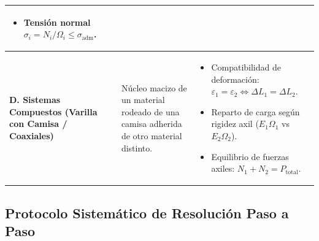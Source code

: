 \begin{table}[H]
{\begin{tabular}{p{4.2cm} p{5.5cm} p{6.2cm}}
\begin{itemize}[leftmargin=*, nosep]
                \item Tensión normal $\sigma_i = N_i / \Omega_i \le \sigma_{\text{adm}}$.
            \end{itemize} \\
            \midrule
            \textbf{D. Sistemas Compuestos (Varilla con Camisa / Coaxiales)} &
            Núcleo macizo de un material rodeado de una camisa adherida de otro material distinto. &
            \begin{itemize}[leftmargin=*, nosep]
                \item Compatibilidad de deformación: $\varepsilon_1 = \varepsilon_2 \iff \Delta L_1 = \Delta L_2$.
                \item Reparto de carga según rigidez axil ($E_1 \Omega_1$ vs $E_2 \Omega_2$).
                \item Equilibrio de fuerzas axiles: $N_1 + N_2 = P_{\text{total}}$.
            \end{itemize} \\
            \bottomrule
        \end{tabular}%
    }
    \label{tab:mapa_tipologias_examen}
\end{table}

\subsection{Protocolo Sistemático de Resolución Paso a Paso}

